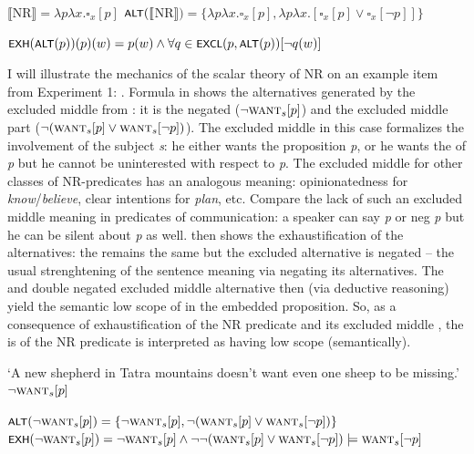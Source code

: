 \documentclass[output=paper, colorlinks, citecolor=brown, newtxmath]{langsci/langscibook}
\begin{document}
\ea \ea \label{ex-25-a} $\llbracket$NR$\rrbracket = \lambda p\lambda x.\square_x[p]$
\ex \label{ex-25-b} $\cnst{alt}(\llbracket$NR$\rrbracket)=\{\lambda p\lambda x.\square_x[p],\lambda p\lambda x.[\square_x[p] \vee \square_x[\neg p]]\}$
\z
\z

\ea \label{ex-26} $\cnst{exh}(\cnst{alt}(p))(p)(w) = p(w) \wedge \forall q \in \cnst{excl}(p,\cnst{alt}(p))[\neg q(w)]$
\z

\noindent I will illustrate the mechanics of the scalar theory of NR on an example item from Experiment 1: . Formula in  shows the alternatives generated by the excluded middle  from : it is the negated  ($\neg \textsc{want}_s[p]$) and the excluded middle part ($\neg(\textsc{want}_s[p] \vee \textsc{want}_s[\neg p])$). The excluded middle in this case formalizes the involvement of the subject \textit{s}: he either wants the proposition \textit{p}, or he wants the  of \textit{p} but he cannot be uninterested with respect to \textit{p}. The excluded middle for other classes of NR-predicates has an analogous meaning: opinionatedness for \textit{know}/\textit{believe}, clear intentions for \textit{plan}, etc. Compare the lack of such an excluded middle meaning in predicates of communication: a speaker can say \textit{p} or neg \textit{p} but he can be silent about \textit{p} as well.  then shows the exhaustification of the alternatives: the  remains the same but the excluded alternative is negated -- the usual strenghtening of the sentence meaning via negating its alternatives. The  and double negated excluded middle alternative then (via deductive reasoning) yield the semantic low scope of  in the embedded proposition. So, as a consequence of exhaustification of the NR predicate and its excluded middle , the  is of the NR predicate is interpreted as having low scope (semantically).

\ea\label{ex-27} `A new shepherd in Tatra mountains doesn't want even one sheep to be missing.'\\ $\neg \textsc{want}_s[p]$
\z

\ea \ea \label{ex-28-a}$\cnst{alt}(\neg \textsc{want}_s[p])=\{\neg \textsc{want}_s[p], \neg(\textsc{want}_s[p] \vee \textsc{want}_s[\neg p])\}$
\ex \label{ex-28-b}$\cnst{exh}(\neg \textsc{want}_s[p])=\neg \textsc{want}_s[p] \wedge \neg \neg(\textsc{want}_s[p] \vee \textsc{want}_s[\neg p]) \models \textsc{want}_s[\neg p]$
\z
\z
\end{document}
